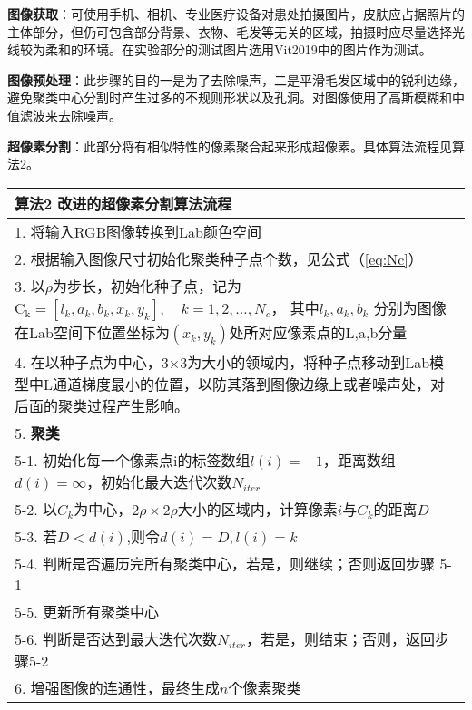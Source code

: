\textbf{图像获取}：可使用手机、相机、专业医疗设备对患处拍摄图片，皮肤应占据照片的主体部分，但仍可包含部分背景、衣物、毛发等无关的区域，拍摄时应尽量选择光线较为柔和的环境。在实验部分的测试图片选用Vit2019中的图片作为测试。

\textbf{图像预处理}：此步骤的目的一是为了去除噪声，二是平滑毛发区域中的锐利边缘，避免聚类中心分割时产生过多的不规则形状以及孔洞。对图像使用了高斯模糊和中值滤波来去除噪声。

\textbf{超像素分割}：此部分将有相似特性的像素聚合起来形成超像素。具体算法流程见算法2。
\begin{table}[htbp]
  \centering
    \begin{tabular}{l}
    \toprule
    \textbf{算法2}  改进的超像素分割算法流程\\
    \midrule
    \multicolumn{1}{p{36em}}{1. 将输入RGB图像转换到Lab颜色空间} \\
    2. 根据输入图像尺寸初始化聚类种子点个数，见公式（\ref{eq:Nc}）\\
    \multicolumn{1}{p{36em}}{3. 以$\rho$为步长，初始化种子点，记为$\mathrm{C}_{\mathrm{k}}=\left[l_{k}, a_{k}, b_{k}, x_{k}, y_{k}\right], \quad k=1,2, \dots, N_{c}$， 其中$l_{k}, a_{k}, b_{k}$ 分别为图像在Lab空间下位置坐标为$\left(x_{k}, y_{k}\right)$处所对应像素点的L,a,b分量}\\
    \multicolumn{1}{p{36em}}{4. 在以种子点为中心，3×3为大小的领域内，将种子点移动到Lab模型中L通道梯度最小的位置，以防其落到图像边缘上或者噪声处，对后面的聚类过程产生影响。}\\
    5. \textbf{聚类}\\
    \multicolumn{1}{p{36em}}{ \hspace{2em} 5-1. 初始化每一个像素点i的标签数组$l(i)=-1$，距离数组$d(i)=\infty$，初始化最大迭代次数$N_{iter}$} \\
    \hspace{2em}5-2. 以$C_k$为中心，$2\rho \times 2\rho$大小的区域内，计算像素$i$与$C_k$的距离$D$ \\
    \hspace{2em}5-3. 若${D}<{d}({i})$,则令$d(i)=D,l(i)=k$ \\
    \hspace{2em}5-4. 判断是否遍历完所有聚类中心，若是，则继续；否则返回步骤 5-1 \\
     \hspace{2em}5-5. 更新所有聚类中心\\
     \hspace{2em}5-6. 判断是否达到最大迭代次数$N_{iter}$，若是，则结束；否则，返回步骤5-2\\
    6. 增强图像的连通性，最终生成$n$个像素聚类\\
     \bottomrule
    \end{tabular}%
\end{table}%

